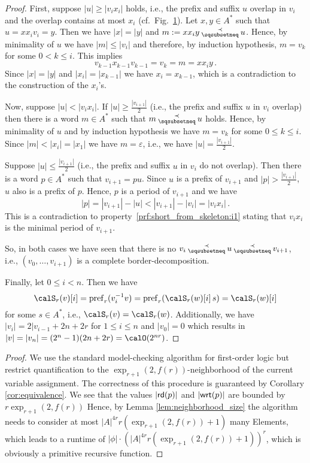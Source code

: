\begin{appendix}
\begin{proof}
		First, suppose $|u|\geq|v_ix_i|$ holds, i.e., the prefix and suffix $u$ overlap in $v_i$ and the overlap contains at most $x_i$ (cf.\ Fig.~\ref{fig:skeleton}). Let $x,y\in A^*$ such that $u=xx_iv_i=y$. Then we have $|x|=|y|$ and $m:=xx_iy\presuf u$. Hence, by minimality of $u$ we have $|m|\leq|v_i|$ and therefore, by induction hypothesis, $m=v_k$ for some $0< k\leq i$. This implies
		\[v_{k-1}x_{k-1}v_{k-1}=v_k=m=xx_iy\,.\]
		Since $|x|=|y|$ and $|x_i|=|x_{k-1}|$ we have $x_i=x_{k-1}$, which is a contradiction to the construction of the $x_i$'s.
		
		\begin{figure}[h]
			\centering
			\caption{\label{fig:skeleton}}
		\end{figure}
		
		Now, suppose $|u|<|v_ix_i|$. If $|u|\geq\frac{|v_{i+1}|}{2}$ (i.e., the prefix and suffix $u$ in $v_i$ overlap) then there is a word $m\in A^*$ such that $m\presuf u$ holds. Hence, by minimality of $u$ and by induction hypothesis we have $m=v_k$ for some $0\leq k\leq i$. Since $|m|<|x_i|=|x_1|$ we have $m=\varepsilon$, i.e., we have $|u|=\frac{|v_{i+1}|}{2}$.
		
		Suppose $|u|\leq\frac{|v_{i+1}|}{2}$ (i.e., the prefix and suffix $u$ in $v_i$ do not overlap). Then there is a word $p\in A^*$ such that $v_{i+1}=pu$. Since $u$ is a prefix of $v_{i+1}$ and $|p|>\frac{|v_{i+1}|}{2}$, $u$ also is a prefix of $p$. Hence, $p$ is a period of $v_{i+1}$ and we have
		\[|p|=|v_{i+1}|-|u|<|v_{i+1}|-|v_i|=|v_ix_i|\,.\]
		This is a contradiction to property~\ref{prf:short_from_skeleton:i1} stating that $v_ix_i$ is the minimal period of $v_{i+1}$.
		
		So, in both cases we have seen that there is no $v_i\presuf u\presuf v_{i+1}$, i.e., $(v_0,\dots,v_{i+1})$ is a complete border-decomposition.
		
			Finally, let $0\leq i<n$. Then we have
		\[\calS_r(v)[i]=\pref_r(\inv{v_i}v)=\pref_r(\calS_r(w)[i]\,s)=\calS_r(w)[i]\]
		for some $s\in A^*$, i.e., $\calS_r(v)=\calS_r(w)$. Additionally, we have $|v_i|=2|v_{i-1}+2n+2r$ for $1\leq i\leq n$ and $|v_0|=0$ which results in $|v|=|v_n|=(2^n-1)(2n+2r)=\calO(2^{nr})$.
	\end{proof}

\decidable*
\begin{proof}
	We use the standard model-checking algorithm for first-order logic but restrict quantification to the $\exp_{r+1}(2,f(r))$-neighborhood of the current variable assignment. The correctness of this procedure is guaranteed by Corollary \ref{cor:equivalence}.
	We see that the values $|\mathsf{rd}(p)|$ and $|\mathsf{wrt}(p)|$ are bounded by $r\exp_{r+1}(2,f(r))$
	Hence, by Lemma \ref{lem:neighborhood_size} the algorithm needs to consider at most $|A|^{4r} r(\exp_{r+1}(2,f(r)) +1)$ many Elements, which leads to a runtime of
	$|\phi| \cdot (|A|^{4r} r(\exp_{r+1}(2,f(r)) +1))^r$, which is obviously a primitive recursive function. 
\end{proof}
\end{appendix}
